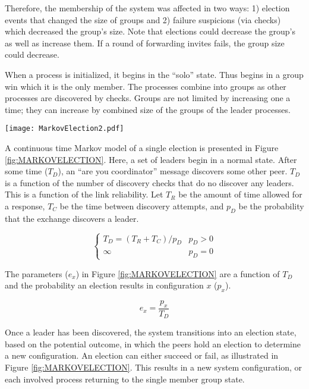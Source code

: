 Therefore, the membership of the system was affected in two ways: 1) election events that changed the size of groups and 2) failure suspicions (via checks) which decreased the group's size.
Note that elections could decrease the group's as well as increase them.
If a round of forwarding invites fails, the group size could decrease.

When a process is initialized, it begins in the ``solo'' state.
Thus begins in a group win which it is the only member. 
The processes combine into groups as other processes are discovered by checks.
Groups are not limited by increasing one a time; they can increase by combined size of the groups of the leader processes.

\begin{figure*}
\centering
\texttt{[image: MarkovElection2.pdf]}
\caption{A diagram showing a partial Markov chain for an election}
\label{fig:MARKOVELECTION}
\end{figure*}

A continuous time Markov model of a single election is presented in Figure \ref{fig:MARKOVELECTION}.
Here, a set of leaders begin in a normal state.
After some time ($T_{D}$), an ``are you coordinator'' message discovers some other peer.
$T_{D}$ is a function of the number of discovery checks that do no discover any leaders. 
This is a function of the link reliability.
Let $T_{R}$ be the amount of time allowed for a response, $T_{C}$ be the time between
discovery attempts, and $p_{D}$ be the probability that the exchange discovers a leader.

\begin{equation}
\begin{cases}
T_{D} = ( T_{R}+T_{C} ) / p_{D} & p_{D} > 0 \\
\infty & p_{D} = 0
\end{cases}
\end{equation}

The parameters ($e_x$) in Figure \ref{fig:MARKOVELECTION} are a function of $T_{D}$ and the probability an election results in configuration $x$ ($p_{x}$).

\begin{equation}
e_x = \frac{p_{x}}{T_{D}}
\end{equation}

Once a leader has been discovered, the system transitions into an election state, based on the potential outcome, in which the peers hold an election to determine a new configuration.
An election can either succeed or fail, as illustrated in Figure \ref{fig:MARKOVELECTION}. 
This results in a new system configuration, or each involved process returning to the single member group state.
 

